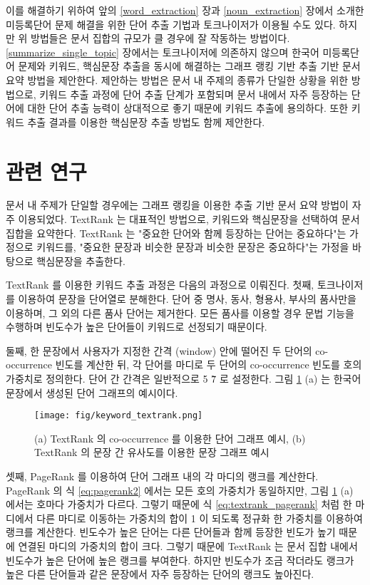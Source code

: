 \documentclass[oneside, ko,phd]{snuthesis_utf8_kor}
\begin{document}
이를 해결하기 위하여 앞의 \ref{word_extraction} 장과 \ref{noun_extraction} 장에서 소개한 미등록단어 문제 해결을 위한 단어 추출 기법과 토크나이저가 이용될 수도 있다.
하지만 위 방법들은 문서 집합의 규모가 클 경우에 잘 작동하는 방법이다.
\ref{summarize_single_topic} 장에서는 토크나이저에 의존하지 않으며 한국어 미등록단어 문제와 키워드, 핵심문장 추출을 동시에 해결하는 그래프 랭킹 기반 추출 기반 문서 요약 방법을 제안한다.
제안하는 방법은 문서 내 주제의 종류가 단일한 상황을 위한 방법으로, 키워드 추출 과정에 단어 추출 단계가 포함되며 문서 내에서 자주 등장하는 단어에 대한 단어 추출 능력이 상대적으로 좋기 때문에 키워드 추출에 용의하다.
또한 키워드 추출 결과를 이용한 핵심문장 추출 방법도 함께 제안한다.

\section{관련 연구}

문서 내 주제가 단일할 경우에는 그래프 랭킹을 이용한 추출 기반 문서 요약 방법이 자주 이용되었다.
TextRank \cite{mihalcea2004textrank} 는 대표적인 방법으로, 키워드와 핵심문장을 선택하여 문서 집합을 요약한다.
TextRank 는 "중요한 단어와 함께 등장하는 단어는 중요하다"는 가정으로 키워드를, "중요한 문장과 비슷한 문장과 비슷한 문장은 중요하다"는 가정을 바탕으로 핵심문장을 추출한다.

TextRank 를 이용한 키워드 추출 과정은 다음의 과정으로 이뤄진다.
첫째, 토크나이저를 이용하여 문장을 단어열로 분해한다.
단어 중 명사, 동사, 형용사, 부사의 품사만을 이용하며, 그 외의 다른 품사 단어는 제거한다.
모든 품사를 이용할 경우 문법 기능을 수행하며 빈도수가 높은 단어들이 키워드로 선정되기 때문이다.

둘째, 한 문장에서 사용자가 지정한 간격 (window) 안에 떨어진 두 단어의 co-occurrence 빈도를 계산한 뒤, 각 단어를 마디로 두 단어의 co-occurrence 빈도를 호의 가중치로 정의한다.
단어 간 간격은 일반적으로 5 \~ 7 로 설정한다.
그림 \ref{fig:textrank} (a) 는 한국어 문장에서 생성된 단어 그래프의 예시이다.

\begin{figure}[H]
\centering
\texttt{[image: fig/keyword\_textrank.png]}
\caption{(a) TextRank 의 co-occurrence 를 이용한 단어 그래프 예시, (b) TextRank 의 문장 간 유사도를 이용한 문장 그래프 예시}
\label{fig:textrank}
\end{figure}

셋째, PageRank \cite{ilprints422} 를 이용하여 단어 그래프 내의 각 마디의 랭크를 계산한다.
PageRank 의 식 \ref{eq:pagerank2} 에서는 모든 호의 가중치가 동일하지만, 그림 \ref{fig:textrank} (a) 에서는 호마다 가중치가 다르다.
그렇기 때문에 식 \ref{eq:textrank_pagerank} 처럼 한 마디에서 다른 마디로 이동하는 가중치의 합이 1 이 되도록 정규화 한 가중치를 이용하여 랭크를 계산한다.
빈도수가 높은 단어는 다른 단어들과 함께 등장한 빈도가 높기 때문에 연결된 마디의 가중치의 합이 크다.
그렇기 때문에 TextRank 는 문서 집합 내에서 빈도수가 높은 단어에 높은 랭크를 부여한다.
하지만 빈도수가 조금 작더라도 랭크가 높은 다른 단어들과 같은 문장에서 자주 등장하는 단어의 랭크도 높아진다.
\end{document}
